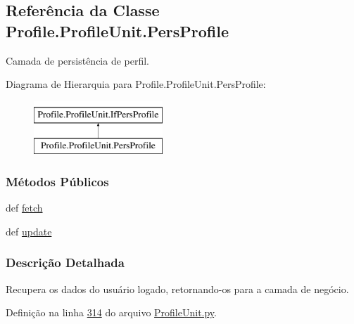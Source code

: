 \hypertarget{classProfile_1_1ProfileUnit_1_1PersProfile}{\subsection{Referência da Classe Profile.\-Profile\-Unit.\-Pers\-Profile}
\label{classProfile_1_1ProfileUnit_1_1PersProfile}
}


Camada de persistência de perfil.  


Diagrama de Hierarquia para Profile.\-Profile\-Unit.\-Pers\-Profile\-:\begin{figure}[H]
\begin{center}
\leavevmode
\includegraphics[height=2.000000cm]{d7/dec/classProfile_1_1ProfileUnit_1_1PersProfile}
\end{center}
\end{figure}
\subsubsection*{Métodos Públicos}
\begin{DoxyCompactItemize}
\item 
def \hyperlink{classProfile_1_1ProfileUnit_1_1PersProfile_aca301abc09bc12a7cf0a61437f941a8a}{fetch}
\item 
def \hyperlink{classProfile_1_1ProfileUnit_1_1PersProfile_af1e4b3cf0eee0a14b5113210503ff665}{update}
\end{DoxyCompactItemize}


\subsubsection{Descrição Detalhada}
Recupera os dados do usuário logado, retornando-\/os para a camada de negócio. 

Definição na linha \hyperlink{ProfileUnit_8py_source_l00314}{314} do arquivo \hyperlink{ProfileUnit_8py_source}{Profile\-Unit.\-py}.



